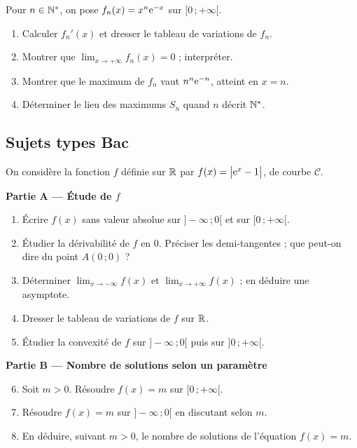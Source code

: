 Pour $n\in\mathbb{N}^*$, on pose $f_n(x)=x^{n}\mathrm{e}^{-x}$ sur $[0\,;+\infty[$.
\begin{enumerate}
	\item Calculer $f_n'(x)$ et dresser le tableau de variations de $f_n$.
	\item Montrer que $\displaystyle\lim_{x\to+\infty}f_n(x)=0$ ; interpréter.
	\item Montrer que le maximum de $f_n$ vaut $n^{n}\mathrm{e}^{-n}$, atteint en
	$x=n$.
	\item Déterminer le lieu des maximums $S_n$ quand $n$ décrit $\mathbb{N}^*$.
\end{enumerate}

\subsection{Sujets types Bac}

On considère la fonction $f$ définie sur $\mathbb{R}$ par $f(x)=\bigl|\mathrm{e}^{x}-1\bigr|$,
de courbe $\mathcal C$.

\textbf{Partie A — Étude de $f$}
\begin{enumerate}
	\item Écrire $f(x)$ sans valeur absolue sur $]-\infty\,;0[$ et sur
	$[0\,;+\infty[$.
	\item Étudier la dérivabilité de $f$ en $0$. Préciser les demi-tangentes ;
	que peut-on dire du point $A(0\,;0)$ ?
	\item Déterminer $\displaystyle\lim_{x\to-\infty}f(x)$ et
	$\displaystyle\lim_{x\to+\infty}f(x)$ ; en déduire une asymptote.
	\item Dresser le tableau de variations de $f$ sur $\mathbb{R}$.
	\item Étudier la convexité de $f$ sur $]-\infty\,;0[$ puis sur
	$]0\,;+\infty[$.
\end{enumerate}

\textbf{Partie B — Nombre de solutions selon un paramètre}
\begin{enumerate}
	\setcounter{enumi}{5}
	\item Soit $m>0$. Résoudre $f(x)=m$ sur $[0\,;+\infty[$.
	\item Résoudre $f(x)=m$ sur $]-\infty\,;0[$ en discutant selon $m$.
	\item En déduire, suivant $m>0$, le nombre de solutions de l'équation
	$f(x)=m$.
\end{enumerate}


